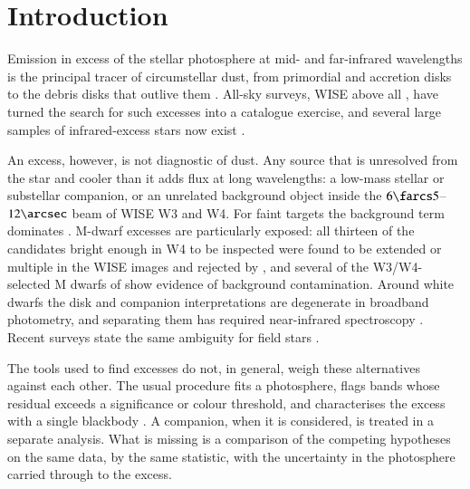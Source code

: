 \documentclass{aa}
\begin{document}

\maketitle

\section{Introduction}
\label{sec:intro}

Emission in excess of the stellar photosphere at mid- and far-infrared wavelengths
is the principal tracer of circumstellar dust, from primordial and accretion disks
to the debris disks that outlive them
\citep{wyatt2008,hughes2018}. All-sky surveys, WISE above all
\citep{wright2010}, have turned the search for such excesses into a catalogue
exercise, and several large samples of infrared-excess stars now exist
\citep[e.g.][]{patel2014,cotten2016,mcdonald2017}.

An excess, however, is not diagnostic of dust. Any source that is unresolved from
the star and cooler than it adds flux at long wavelengths: a low-mass stellar or
substellar companion, or an unrelated background object inside the
$6\farcs5$--$12\arcsec$ beam of WISE W3 and W4. For faint targets the background
term dominates \citep{kennedy2012}. M-dwarf excesses are particularly exposed:
all thirteen of the \citet{theissen2014} candidates bright enough in W4 to be
inspected were found to be extended or multiple in the WISE images and rejected
by \citet{silverberg2018}, and several of the W3/W4-selected M dwarfs of
\citet{ren2026} show evidence of background contamination. Around white dwarfs the disk and
companion interpretations are degenerate in broadband photometry, and separating
them has required near-infrared spectroscopy \citep{owens2023}. Recent surveys
state the same ambiguity for field stars \citep{esteves2026}.

The tools used to find excesses do not, in general, weigh these alternatives
against each other. The usual procedure fits a photosphere, flags bands whose
residual exceeds a significance or colour threshold, and characterises the excess
with a single blackbody
\citep[e.g.][]{bayo2008,mcdonald2017,mcdonald2024}. A companion, when it is
considered, is treated in a separate analysis. What is missing is a comparison of
the competing hypotheses on the same data, by the same statistic, with the
uncertainty in the photosphere carried through to the excess.
\end{document}
